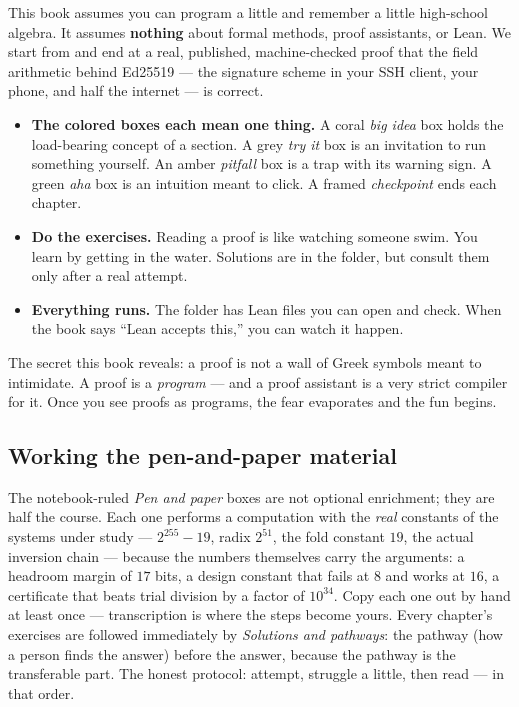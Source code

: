 \documentclass[11pt]{report}
\begin{document}
This book assumes you can program a little and remember a little high-school
algebra. It assumes \textbf{nothing} about formal methods, proof assistants, or
Lean. We start from  and end at a real, published,
machine-checked proof that the field arithmetic behind Ed25519 --- the signature
scheme in your SSH client, your phone, and half the internet --- is correct.

\begin{itemize}[leftmargin=1.4em]
  \item \textbf{The colored boxes each mean one thing.} A coral
  \emph{big idea} box holds the load-bearing concept of a section. A grey
  \emph{try it} box is an invitation to run something yourself. An amber
  \emph{pitfall} box is a trap with its warning sign. A green \emph{aha} box is
  an intuition meant to click. A framed \emph{checkpoint} ends each chapter.
  \item \textbf{Do the exercises.} Reading a proof is like watching someone
  swim. You learn by getting in the water. Solutions are in the 
  folder, but consult them only after a real attempt.
  \item \textbf{Everything runs.} The  folder has Lean files you
  can open and check. When the book says ``Lean accepts this,'' you can watch it
  happen.
\end{itemize}

\begin{aha}
The secret this book reveals: a proof is not a wall of Greek symbols meant to
intimidate. A proof is a \emph{program} --- and a proof assistant is a very
strict compiler for it. Once you see proofs as programs, the fear evaporates and
the fun begins.
\end{aha}

\subsection*{Working the pen-and-paper material}

The notebook-ruled \emph{Pen and paper} boxes are not optional
enrichment; they are half the course. Each one performs a computation
with the \emph{real} constants of the systems under study ---
$2^{255}-19$, radix $2^{51}$, the fold constant $19$, the actual
inversion chain --- because the numbers themselves carry the arguments:
a headroom margin of $17$ bits, a design constant that fails at $8$ and
works at $16$, a certificate that beats trial division by a factor of
$10^{34}$. Copy each one out by hand at least once --- transcription is
where the steps become yours. Every chapter's exercises are followed
immediately by \emph{Solutions and pathways}: the pathway (how a person
finds the answer) before the answer, because the pathway is the
transferable part. The honest protocol: attempt, struggle a little,
then read --- in that order.
\end{document}
